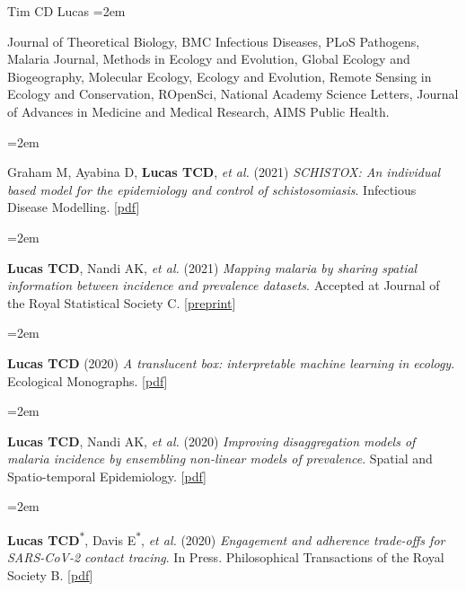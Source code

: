\documentclass{scrartcl}
\newcommand{\MarginText}[1]{\marginpar{\raggedleft\itshape\small#1}} %
\newcommand{\Description}[1]{\hangindent=2em\hangafter=0\noindent\raggedright\footnotesize{#1}\par\normalsize\vspace{1em}} %
\begin{document}
\begin{cv}{Tim {\Large CD} Lucas}
\Description{Journal of Theoretical Biology, BMC Infectious Diseases, PLoS Pathogens, Malaria Journal, Methods in Ecology and Evolution, Global Ecology and Biogeography, Molecular Ecology, Ecology and Evolution, Remote Sensing in Ecology and Conservation, ROpenSci, National Academy Science Letters, Journal of Advances in Medicine and Medical Research, AIMS Public Health.}




\vspace{1em} %

{\color{Maroon}}\vspace{1em}


\Description{\MarginText{2021}Graham M, Ayabina D, \textbf{Lucas TCD}, \emph{et al.} (2021) \emph{SCHISTOX: An individual based model for the epidemiology and control of schistosomiasis}. Infectious Disease Modelling. [\href{https://www.sciencedirect.com/science/article/pii/S2468042721000130}{pdf}]}

\Description{\textbf{Lucas TCD}, Nandi AK,  \emph{et al.} (2021) \emph{Mapping malaria by sharing spatial information between incidence and prevalence datasets}. Accepted at Journal of the Royal Statistical Society C. [\href{https://www.medrxiv.org/content/10.1101/2020.02.14.20023069v1}{preprint}]}

\Description{\MarginText{2020}\textbf{Lucas TCD} (2020) \emph{A translucent box: interpretable machine learning in ecology}. Ecological Monographs. [\href{https://esajournals.onlinelibrary.wiley.com/doi/epdf/10.1002/ecm.1422}{pdf}]}


\Description{\textbf{Lucas TCD}, Nandi AK,  \emph{et al.} (2020) \emph{ Improving disaggregation models of malaria incidence by ensembling non-linear models of prevalence}. Spatial and Spatio-temporal Epidemiology. [\href{https://reader.elsevier.com/reader/sd/pii/S1877584520300356?token=A7B0EF0114C0A057AD7F1E13B7F97FE4D359B945C1F09211AC50B77D272216014E3E9881E3FBFC7D3CA8A8DD5A78846A}{pdf}]}

\Description{\textbf{Lucas TCD}\textsuperscript{$\ast$}, Davis E\textsuperscript{$\ast$}, \emph{et al.} (2020) \emph{Engagement and adherence trade-offs for SARS-CoV-2 contact tracing}. In Press. Philosophical Transactions of the Royal Society B. [\href{https://eprints.soton.ac.uk/445257/1/2020.08.20.20178558v1.full.pdf}{pdf}]}



\end{cv}
\end{document}
